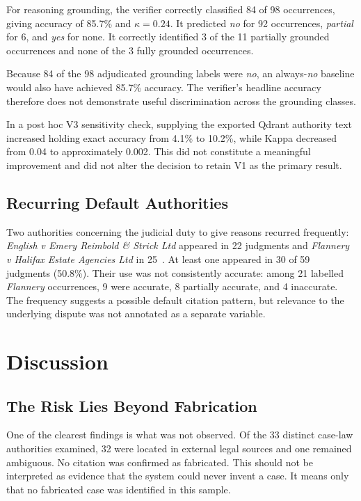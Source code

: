 \documentclass[conference]{IEEEtran}
\begin{document}
For reasoning grounding, the verifier correctly classified 84 of 98 occurrences, giving accuracy of 85.7\% and $\kappa = 0.24$. It predicted \textit{no} for 92 occurrences, \textit{partial} for 6, and \textit{yes} for none. It correctly identified 3 of the 11 partially grounded occurrences and none of the 3 fully grounded occurrences.

Because 84 of the 98 adjudicated grounding labels were \textit{no}, an always-\textit{no} baseline would also have achieved 85.7\% accuracy. The verifier's headline accuracy therefore does not demonstrate useful discrimination across the grounding classes.

In a post hoc V3 sensitivity check, supplying the exported Qdrant authority text increased holding exact accuracy from 4.1\% to 10.2\%, while Kappa decreased from 0.04 to approximately 0.002. This did not constitute a meaningful improvement and did not alter the decision to retain V1 as the primary result.

\subsection{Recurring Default Authorities}

Two authorities concerning the judicial duty to give reasons recurred frequently: \textit{English v Emery Reimbold \& Strick Ltd} appeared in 22 judgments and \textit{Flannery v Halifax Estate Agencies Ltd} in 25~\cite{english2002,flannery1999}. At least one appeared in 30 of 59 judgments (50.8\%). Their use was not consistently accurate: among 21 labelled \textit{Flannery} occurrences, 9 were accurate, 8 partially accurate, and 4 inaccurate. The frequency suggests a possible default citation pattern, but relevance to the underlying dispute was not annotated as a separate variable.

\section{Discussion}

\subsection{The Risk Lies Beyond Fabrication}

One of the clearest findings is what was not observed. Of the 33 distinct case-law authorities examined, 32 were located in external legal sources and one remained ambiguous. No citation was confirmed as fabricated. This should not be interpreted as evidence that the system could never invent a case. It means only that no fabricated case was identified in this sample.
\end{document}
